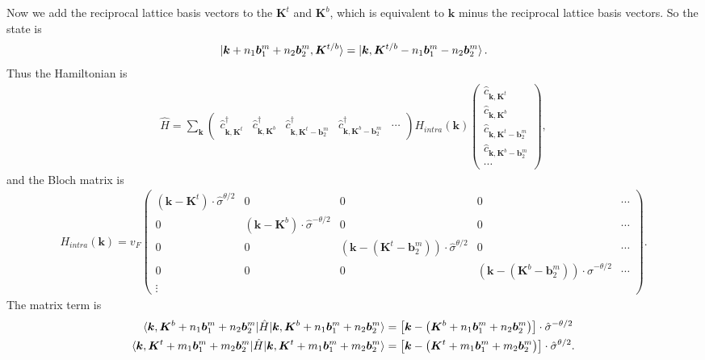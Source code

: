 \documentclass[10pt, oneside]{article}
\newcommand{\te}{\theta}
\newcommand{\p}[1]{\left(#1\right)}
\newcommand{\bb}[1]{\left[#1\right]}
\begin{document}
Now we add the reciprocal lattice basis vectors to the \(\bm{K}^{t}\) and \(\bm{K}^{b}\), which is equivalent to \(\bm{k} \) minus the reciprocal lattice basis vectors. So the state is 
\begin{align}
	\ket{\bm{k} + n_{1} \bm{b}^{m}_{1} + n_{2} \bm{b}^{m}_{2}, \bm{K}^{t/b}} = \ket{\bm{k}, \bm{K}^{t/b} - n_{1} \bm{b}^{m}_{1} - n_{2} \bm{b}^{m}_{2}}.
\end{align}
Thus the Hamiltonian is
\begin{align}
	\hat{H} = \sum_{\bm{k}} \begin{pmatrix}
		\hat{c}^{\dagger}_{\bm{k},\bm{K}^{t}} & \hat{c}^{\dagger}_{\bm{k},\bm{K}^{b}} & \hat{c}^{\dagger}_{\bm{k} , \bm{K}^{t} - \bm{b}^{m}_{2}} & \hat{c}^{\dagger}_{\bm{k},\bm{K}^{b} - \bm{b}^{m}_{2}} & \cdots
	\end{pmatrix}
	H_{intra}\p{\bm{k}}
	\begin{pmatrix}
		\hat{c}_{\bm{k},\bm{K}^{t}} \\ \hat{c}_{\bm{k},\bm{K}^{b}} \\ \hat{c}_{\bm{k}, \bm{K}^{t} - \bm{b}^{m}_{2}} \\ \hat{c}_{\bm{k} ,\bm{K}^{b} - \bm{b}^{m}_{2}} \\ \cdots
	\end{pmatrix},
\end{align}
and the Bloch matrix is
\begin{align}
	H_{intra}\p{\bm{k}} = v_{F}	\begin{pmatrix}
		\p{\bm{k} - \bm{K}^{t}} \cdot\hat{\sigma}^{\te/2} & 0 & 0 & 0 & \cdots \\
		0 &  \p{\bm{k} - \bm{K}^{b}} \cdot \hat{\sigma}^{- \te/2}& 0 & 0 &  \cdots \\
		0 & 0 & \p{\bm{k}  -\p{ \bm{K}^{t} - \bm{b}^{m}_{2}}} \cdot \hat{\sigma}^{\te/2} & 0 &  \cdots \\
		0 & 0 & 0 & \p{\bm{k}  - \p{\bm{K}^{b} - \bm{b}^{m}_{2}}} \cdot \hat{\sigma}^{- \te/2} & \cdots \\
		\vdots
	\end{pmatrix} .
\end{align}
The matrix term is 
\begin{align}
	\begin{split}
		\braket{\bm{k}, \bm{K}^{b} + n_{1} \bm{b}^{m}_{1} + n_{2} \bm{b}^{m}_{2}| \hat{H} |\bm{k}, \bm{K}^{b} + n_{1} \bm{b}^{m}_{1} + n_{2} \bm{b}^{m}_{2} } &= \bb{\bm{k} - \p{\bm{K}^{b} + n_{1} \bm{b}^{m}_{1} + n_{2} \bm{b}^{m}_{2}}}\cdot \hat{\sigma}^{- \te/2}  \\
		\braket{\bm{k}, \bm{K}^{t} + m_{1} \bm{b}^{m}_{1} + m_{2} \bm{b}^{m}_{2}| \hat{H}|\bm{k}, \bm{K}^{t} + m_{1} \bm{b}^{m}_{1} + m_{2} \bm{b}^{m}_{2} } &= \bb{\bm{k} - \p{\bm{K}^{t} + m_{1} \bm{b}^{m}_{1} + m_{2} \bm{b}^{m}_{2}}}\cdot \hat{\sigma}^{\te/2}.
	\end{split}
\end{align}
\end{document}
